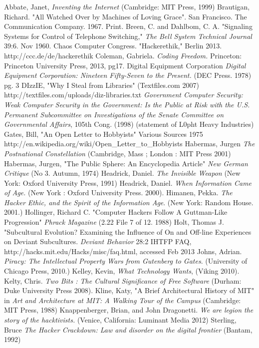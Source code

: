 
Abbate, Janet, \emph{Inventing the Internet} (Cambridge: MIT Press, 1999)
Brautigan, Richard. "All Watched Over by Machines of Loving Grace". San Francisco. The Communication Company. 1967. Print.
Breen, C. and Dahlbom, C. A. "Signaling Systems for Control of Telephone Switching," \emph{The Bell System Technical Journal} 39:6. Nov 1960.
Chaos Computer Congress. "Hackerethik," Berlin 2013. http://ccc.de/de/hackerethik
Coleman, Gabriela. \emph{Coding Freedom.} Princeton: Princeton University Press, 2013, pg17.
Digital Equipment Corporation \emph{Digital Equipment Corporation: Nineteen Fifty-Seven to the Present.} (DEC Press. 1978) pg. 3
DIzzIE, "Why I Steal from Libraries" (Textfiles.com 2007) http://textfiles.com/uploads/diz-libraries.txt
\emph{Government Computer Security: Weak Computer Security in the Government: Is the Public at Risk with the U.S. Permanent Subcommittee on Investigations of the Senate Committee on Governmental Affairs}, 105th Cong. (1998) (statement of L0pht Heavy Industries) 
Gates, Bill, "An Open Letter to Hobbyists" Various Sources 1975 http://en.wikipedia.org/wiki/Open\_Letter\_to\_Hobbyists
Habermas, Jurgen \emph{The Postnational Constellation} (Cambridge, Mass ; London : MIT Press 2001)
Habermas, Jurgen, "The Public Sphere: An Encyclopedia Article" \emph{New German Critique} (No 3. Autumn, 1974) 
Headrick, Daniel. \emph{The Invisible Weapon} (New York: Oxford University Press, 1991)
Headrick, Daniel. \emph{When Information Came of Age.} (New York : Oxford University Press. 2000).
Himanen, Pekka. \emph{The Hacker Ethic, and the Spirit of the Information Age}. (New York: Random House. 2001.)
Hollinger, Richard C. "Computer Hackers Follow A Guttman-Like Progression"  \emph{Phrack Magazine} (2.22 File 7 of 12. 1988)
Holt, Thomas J. "Subcultural Evolution? Examining the Influence of On and Off-line Experiences on Deviant Subcultures. \emph{Deviant Behavior} 28:2
IHTFP FAQ,  http://hacks.mit.edu/Hacks/misc/faq.html, accessed Feb 2013
Johns, Adrian. \emph{Piracy: The Intellectual Property Wars from Gutenberg to Gates}. (University of Chicago Press, 2010.)
Kelley, Kevin, \emph{What Technology Wants}, (Viking 2010).
Kelty, Chris. \emph{Two Bits : The Cultural Significance of Free Software} (Durham: Duke University Press 2008).
Kline, Katy, "A Brief Architectural History of MIT" in \emph{Art and Architecture at MIT: A Walking Tour of the Campus} (Cambridge: MIT Press, 1988)
Knappenberger, Brian, and John Dragonetti. \emph{We are legion the story of the hacktivists.} (Venice, California: Luminant Media 2012)
Sterling, Bruce \emph{The Hacker Crackdown: Law and disorder on the digital frontier} (Bantam, 1992)
